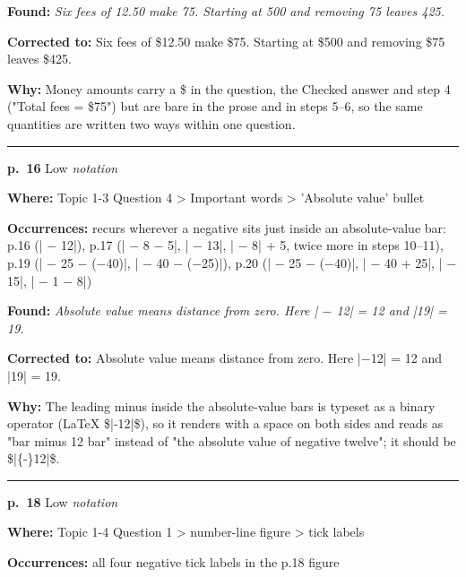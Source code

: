 \documentclass[11pt]{article}
\newcommand{\sevlow}[1]{\textcolor{black!55}{#1}}
\begin{document}
\noindent\textbf{Found: }\textit{Six fees of 12.50 make 75. Starting at 500 and removing 75 leaves 425.}\par
\noindent\textbf{Corrected to: }Six fees of \$12.50 make \$75. Starting at \$500 and removing \$75 leaves \$425.\par
\noindent\textbf{Why: }Money amounts carry a \$ in the question, the Checked answer and step 4 ("Total fees = \$75") but are bare in the prose and in steps 5--6, so the same quantities are written two ways within one question.\par\vspace{4pt}
\noindent\rule{\textwidth}{0.4pt}\par\nobreak\vspace{2pt}
\noindent\textbf{p.~16} \quad \sevlow{Low} \quad \textit{notation}\par
\noindent\textbf{Where: }Topic 1-3 Question 4 > Important words > 'Absolute value' bullet\par
\noindent\textbf{Occurrences: }recurs wherever a negative sits just inside an absolute-value bar: p.16 (| $-$ 12|), p.17 (| $-$ 8 $-$ 5|, | $-$ 13|, | $-$ 8| + 5, twice more in steps 10--11), p.19 (| $-$ 25 $-$ ($-$40)|, | $-$ 40 $-$ ($-$25)|), p.20 (| $-$ 25 $-$ ($-$40)|, | $-$ 40 + 25|, | $-$ 15|, | $-$ 1 $-$ 8|)\par
\noindent\textbf{Found: }\textit{Absolute value means distance from zero. Here | $-$ 12| = 12 and |19| = 19.}\par
\noindent\textbf{Corrected to: }Absolute value means distance from zero. Here |$-$12| = 12 and |19| = 19.\par
\noindent\textbf{Why: }The leading minus inside the absolute-value bars is typeset as a binary operator (LaTeX \$|-12|\$), so it renders with a space on both sides and reads as "bar minus 12 bar" instead of "the absolute value of negative twelve"; it should be \$|\{-\}12|\$.\par\vspace{4pt}
\noindent\rule{\textwidth}{0.4pt}\par\nobreak\vspace{2pt}
\noindent\textbf{p.~18} \quad \sevlow{Low} \quad \textit{notation}\par
\noindent\textbf{Where: }Topic 1-4 Question 1 > number-line figure > tick labels\par
\noindent\textbf{Occurrences: }all four negative tick labels in the p.18 figure\par
\end{document}
